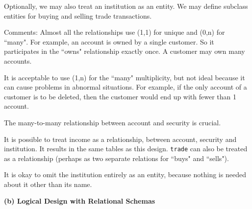 Optionally, we may also treat an institution as an entity. We may define subclass entities for buying and selling trade transactions.

\bigskip





Comments: Almost all the relationships use (1,1) for unique and (0,n) for ``many". For example, an account is owned by a single customer. So it participates in the ``owns" relationship exactly once. A customer may own many accounts.

It is acceptable to use (1,n) for the ``many" multiplicity, but not ideal because it can cause problems in abnormal situations. For example, if the only account of a customer is to be deleted, then the customer would end up with fewer than 1 account.

The many-to-many relationship between account and security is crucial.

It is possible to treat income as a relationship, between account, security and institution. It results in the same tables as this design. \texttt{trade} can also be treated as a relationship (perhaps as two separate relations for ``buys" and ``sells").

It is okay to omit the institution entirely as an entity, because nothing is needed about it other than its name.

\textbf{(b) Logical Design with Relational Schemas} \\

